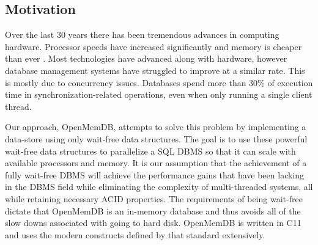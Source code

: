 \documentclass[conference, compsoc]{IEEEtran}
\newcommand{\CC}{C\nolinebreak\hspace{-.05em}\raisebox{.4ex}{\tiny\bf +}\nolinebreak\hspace{-.10em}\raisebox{.4ex}{\tiny\bf +}}
\begin{document}
\subsection{Motivation}
Over the last 30 years there has been tremendous advances in computing
hardware. Processor speeds have increased significantly and memory is cheaper than ever
\cite{stonebraker2007end}. Most technologies have advanced 
along with hardware, however database management systems have struggled to improve
at a similar rate. This is mostly due to concurrency issues. Databases spend more than 30\% 
of execution time in synchronization-related operations, even when only running a single
client thread\cite{soares2015database}.
\par\vspace{\baselineskip}
Our approach, OpenMemDB, attempts to solve this problem by implementing a data-store 
using only wait-free data structures. The goal is to use these powerful wait-free data 
structures to parallelize a SQL DBMS so that it can scale with available processors
and memory. It is our assumption that the achievement of a fully wait-free DBMS will 
achieve the performance gains that have been lacking in the DBMS field while eliminating 
the complexity of multi-threaded systems, all while retaining necessary ACID properties. 
The requirements of being wait-free dictate that OpenMemDB is an in-memory database and 
thus avoids all of the slow downs associated with going to hard disk. OpenMemDB is written 
in \CC 11 and uses the modern constructs defined by that standard extensively.
\par\vspace{\baselineskip}
\end{document}
